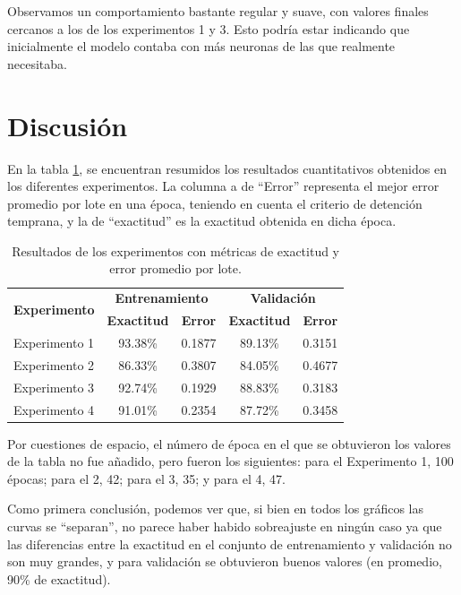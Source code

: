 \documentclass[aps,twocolumn,groupedaddress]{revtex4-2}
\begin{document}
Observamos un comportamiento bastante regular y suave, con valores finales cercanos a los de los experimentos 1 y 3. Esto podría estar indicando que inicialmente el modelo contaba con más neuronas de las que realmente necesitaba.

\section{Discusión}
En la tabla \ref{tab:experimentos}, se encuentran resumidos los resultados cuantitativos obtenidos en los diferentes experimentos. La columna a de ``Error'' representa el mejor error promedio por lote en una época, teniendo en cuenta el criterio de detención temprana, y la de ``exactitud'' es la exactitud obtenida en dicha época.

\begin{table}[h!]
\centering
\begin{tabular}{lcc|cc}
\toprule
\multirow{2}{*}{\textbf{Experimento}} \hspace{3pt} & \multicolumn{2}{c|}{\textbf{Entrenamiento}} & \multicolumn{2}{c}{\textbf{Validación}} \\
& \textbf{Exactitud} \hspace{3pt} & \textbf{Error} \hspace{3pt} & \hspace{3pt} \textbf{Exactitud} \hspace{3pt} & \textbf{Error} \\
\midrule
Experimento 1  & 93.38\% & 0.1877 & 89.13\% & 0.3151  \\
Experimento 2  & 86.33\% & 0.3807 & 84.05\% & 0.4677  \\
Experimento 3  & 92.74\% & 0.1929 & 88.83\% & 0.3183  \\
Experimento 4  & 91.01\% & 0.2354 & 87.72\% & 0.3458  \\
\bottomrule
\end{tabular}
\caption{Resultados de los experimentos con métricas de exactitud y error promedio por lote.}
\label{tab:experimentos}
\end{table}

Por cuestiones de espacio, el número de época en el que se obtuvieron los valores de la tabla no fue añadido, pero fueron los siguientes: para el Experimento 1, 100 épocas; para el 2, 42; para el 3, 35; y para el 4, 47.

Como primera conclusión, podemos ver que, si bien en todos los gráficos las curvas se ``separan'', no parece haber habido sobreajuste en ningún caso ya que las diferencias entre la exactitud en el conjunto de entrenamiento y validación no son muy grandes, y para validación se obtuvieron buenos valores (en promedio, 90\% de exactitud).
\end{document}
